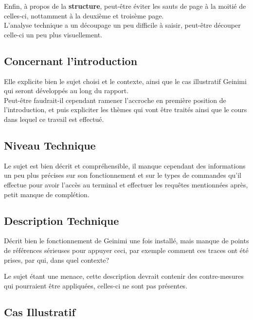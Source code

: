 \documentclass[a4paper,10pt,final,fleqn]{article}
\begin{document}
			Enfin, à propos de la \textbf{structure}, peut-être éviter les sauts de page à la moitié de celles-ci, nottamment à la deuxième et troisème page.\\
			L'analyse technique a un découpage un peu difficile à saisir, peut-être découper celle-ci un peu plus visuellement.\\

		\subsection{Concernant l'introduction}

			Elle explicite bien le sujet choisi et le contexte, ainsi que le cas illustratif Geinimi qui seront développés au long du rapport.\\

			Peut-être faudrait-il cependant ramener l'accroche en première position de l'introduction, et puis expliciter les thèmes qui vont être traités ainsi que le cours dans lequel ce travail est effectué.\\

		\subsection{Niveau Technique}

			Le sujet est bien décrit et compréhensible, il manque cependant des informations un peu plus précises sur son fonctionnement et sur le types de commandes qu'il effectue pour avoir l'accès au terminal et effectuer les requêtes mentionnées après, petit manque de complétion.\\

		\subsection{Description Technique}

			Décrit bien le fonctionnement de Geinimi une fois installé, mais manque de points de références sérieuses pour appuyer ceci, par exemple comment ces traces ont été prises, par qui, dans quel contexte?

			Le sujet étant une menace, cette description devrait contenir des contre-mesures qui pourraient être appliquées, celles-ci ne sont pas présentes.\\

		\subsection{Cas Illustratif}
\end{document}
